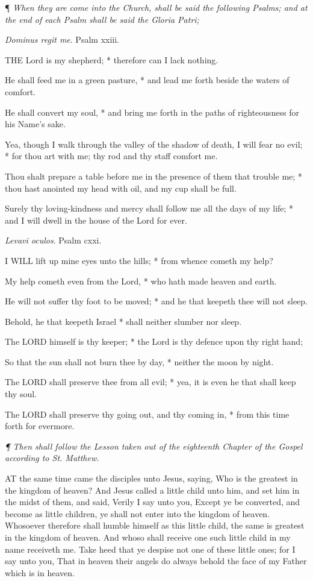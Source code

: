 ¶
\emph{When they are come into the Church, shall be said the following Psalms;
and at the end of each Psalm shall be said the Gloria Patri;}

\emph{Dominus
regit me}. Psalm xxiii.

THE
Lord is my shepherd; * therefore can I lack nothing.

He shall feed me in a green pasture, * and lead me
forth beside the waters of comfort.

He shall convert my soul, * and bring me forth in the
paths of righteousness for his Name's sake.

Yea, though I walk through the valley of the shadow
of death, I will fear no evil; * for thou art with me; thy rod and thy
staff comfort me.

Thou shalt prepare a table before me in the presence
of them that trouble me; * thou hast anointed my head with oil, and my
cup shall be full.

Surely thy loving-kindness and mercy shall follow me
all the days of my life; * and I will dwell in the house of the Lord for
ever.

\emph{Levavi
oculos}. Psalm cxxi.

I
WILL lift up mine eyes unto the hills; * from whence cometh my help?

My help cometh even from the Lord, * who hath made
heaven and earth.

He will not suffer thy foot to be moved; * and he that
keepeth thee will not sleep.

Behold, he that keepeth Israel * shall neither slumber
nor sleep.

The LORD himself is thy keeper;
* the Lord is thy defence upon thy right hand;

So that the sun shall not burn thee by day, * neither
the moon by night.

The LORD shall preserve thee
from all evil; * yea, it is even he that shall keep thy soul.

The LORD shall preserve thy
going out, and thy coming in, * from this time forth for evermore.

\emph{¶
Then shall follow the Lesson taken out of the eighteenth Chapter of
the Gospel according to St. Matthew.}

AT
the same time came the disciples unto Jesus, saying, Who is the greatest
in the kingdom of heaven? And Jesus called a little child unto him,
and set him in the midst of them, and said, Verily I say unto you, Except
ye be converted, and become as little children, ye shall not enter into
the kingdom of heaven. Whosoever therefore shall humble himself as this
little child, the same is greatest in the kingdom of heaven. And whoso
shall receive one such little child in my name receiveth me. Take heed
that ye despise not one of these little ones; for I say unto you, That
in heaven their angels do always behold the face of my Father which
is in heaven. 

